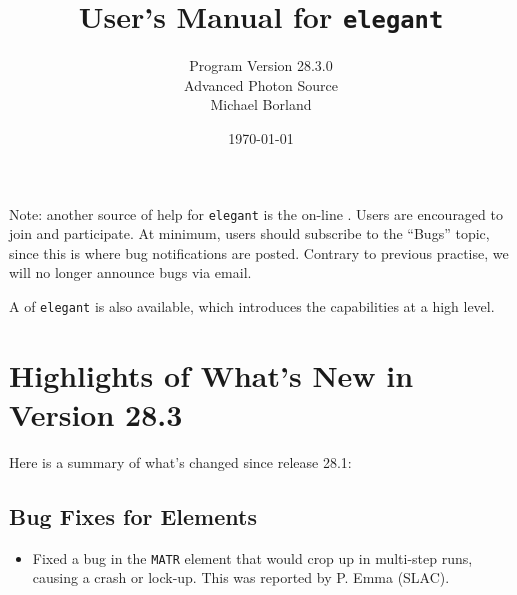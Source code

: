 \documentclass[11pt]{article}
\begin{document}
\title{User's Manual for {\tt elegant}}
\author{Program Version 28.3.0\\Advanced Photon Source\\Michael Borland\\ \date{\today}}
\maketitle

Note: another source of help for {\tt elegant} is the on-line
.
Users are encouraged to join and participate.  At minimum, users should subscribe to the ``Bugs'' topic,
since this is where bug notifications are posted.  Contrary to previous practise, we will no longer announce
bugs via email.

A  of {\tt elegant} is also available, which introduces the capabilities
at a high level.

\section{Highlights of What's New in Version 28.3}

Here is a summary of what's changed since release 28.1:

\subsection{Bug Fixes for Elements}

\begin{itemize}
\item Fixed a bug in the \verb|MATR| element that would crop up in multi-step runs, causing a crash or lock-up.
  This was reported by P. Emma (SLAC).
\end{itemize}
\end{document}
